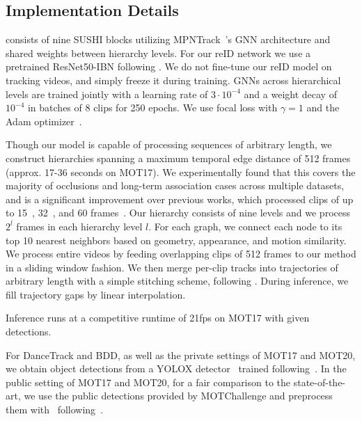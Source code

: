 \documentclass[10pt,twocolumn,letterpaper]{article}
\begin{document}
{{\subsection{Implementation Details} 
   \modelname consists of nine SUSHI blocks utilizing MPNTrack~\cite{mpntrack}'s GNN architecture and shared weights between hierarchy levels. For our reID network we use a pretrained ResNet50-IBN following \cite{lpc}. We do not fine-tune our reID model on tracking videos, and simply freeze it during training. GNNs across hierarchical levels are trained jointly with a learning rate of $3\cdot10^{-4}$ and a weight decay of $10^{-4}$ in batches of 8 clips for 250 epochs. We use focal loss with $\gamma = 1$ and the Adam optimizer~\cite{adam}. 

 Though our model is capable of processing sequences of arbitrary length, we construct hierarchies spanning a maximum temporal edge distance of 512 frames (approx. 17-36 seconds on MOT17). We experimentally found that this covers the majority of occlusions and long-term association cases across multiple datasets, and is a significant improvement over previous works, which processed clips of up to 15~\cite{mpntrack}, 32~\cite{zhou2022global}, and 60 frames~\cite{lift, aplift}.
Our hierarchy consists of nine levels and we process $2^{l}$ frames in each hierarchy level $l$. For each graph, we connect each node to its top 10 nearest neighbors based on geometry, appearance, and motion similarity. We process entire videos by feeding overlapping clips of 512 frames to our method in a sliding window fashion. We then merge per-clip tracks into trajectories of arbitrary length with a simple stitching scheme, following \cite{mpntrack}. During inference, we fill trajectory gaps by linear interpolation. 

 Inference runs at a competitive runtime of 21fps on MOT17 with given detections.




 For DanceTrack and BDD, as well as the private settings of MOT17 and MOT20, we obtain object detections from a YOLOX detector~\cite{ge2021yolox} trained following~\cite{bytetrack}. In the public setting of MOT17 and MOT20, for a fair comparison to the state-of-the-art, we use the public detections provided by MOTChallenge and preprocess them with~\cite{tracktor} following~\cite{mpntrack, lift,  lpc, gmt}.



}}
\end{document}
